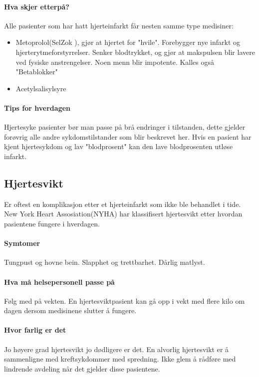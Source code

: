 				\paragraph{Hva skjer etterpå?\\}
					Alle pasienter som har hatt hjerteinfarkt får nesten samme type medisiner:
					\begin{itemize}
						\item Metoprolol(SelZok \textregistered), gjør at hjertet for "hvile". Forebygger nye infarkt og hjerterytmeforstyrrelser. Senker blodtrykket, og gjør at makspulsen blir lavere ved fysiske anstrengelser. Noen menn blir impotente. Kalles også "Betablokker"\\
						\item Acetylsalisylsyre\\%
					\end{itemize}
				\paragraph{Tips for hverdagen\\}
					Hjertesyke pasienter bør man passe på brå endringer i tilstanden, dette gjelder forøvrig alle andre sykdomstilstander som blir beskrevet her. Hvis en pasient har kjent hjertesykdom og lav "blodprosent" kan den lave blodprosenten utløse infarkt.
			\subsection{Hjertesvikt}
				Er oftest en komplikasjon etter et hjerteinfarkt som ikke ble behandlet i tide. New York Heart Assosiation(NYHA) har klassifisert hjertesvikt etter hvordan pasientene fungere i hverdagen. 
				\paragraph{Symtomer\\}
					Tungpust og hovne bein. Slapphet og trettbarhet. Dårlig matlyst.
				\paragraph{Hva må helsepersonell passe på\\}
					Følg med på vekten. En hjertesviktpasient kan gå opp i vekt med flere kilo om dagen dersom medisinene slutter å fungere. 
				\paragraph{Hvor farlig er det\\}
					Jo høyere grad hjertesvikt jo dødligere er det. En alvorlig hjertesvikt er å sammenligne med kreftsykdommer med spredning. Ikke glem å rådføre med lindrende avdeling når det gjelder disse pasientene.
